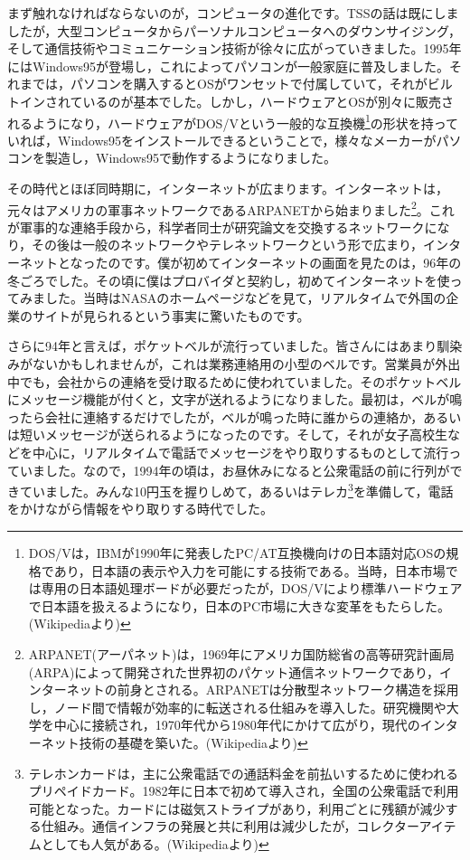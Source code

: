 \documentclass{ltjsbook}
\begin{document}
まず触れなければならないのが，コンピュータの進化です。TSSの話は既にしましたが，大型コンピュータからパーソナルコンピュータへのダウンサイジング，そして通信技術やコミュニケーション技術が徐々に広がっていきました。1995年にはWindows95が登場し，これによってパソコンが一般家庭に普及しました。それまでは，パソコンを購入するとOSがワンセットで付属していて，それがビルトインされているのが基本でした。しかし，ハードウェアとOSが別々に販売されるようになり，ハードウェアがDOS/Vという一般的な互換機\footnote{DOS/Vは，IBMが1990年に発表したPC/AT互換機向けの日本語対応OSの規格であり，日本語の表示や入力を可能にする技術である。当時，日本市場では専用の日本語処理ボードが必要だったが，DOS/Vにより標準ハードウェアで日本語を扱えるようになり，日本のPC市場に大きな変革をもたらした。(Wikipediaより)}の形状を持っていれば，Windows95をインストールできるということで，様々なメーカーがパソコンを製造し，Windows95で動作するようになりました。

その時代とほぼ同時期に，インターネットが広まります。インターネットは，元々はアメリカの軍事ネットワークであるARPANETから始まりました\footnote{ARPANET(アーパネット)は，1969年にアメリカ国防総省の高等研究計画局(ARPA)によって開発された世界初のパケット通信ネットワークであり，インターネットの前身とされる。ARPANETは分散型ネットワーク構造を採用し，ノード間で情報が効率的に転送される仕組みを導入した。研究機関や大学を中心に接続され，1970年代から1980年代にかけて広がり，現代のインターネット技術の基礎を築いた。(Wikipediaより)}。これが軍事的な連絡手段から，科学者同士が研究論文を交換するネットワークになり，その後は一般のネットワークやテレネットワークという形で広まり，インターネットとなったのです。僕が初めてインターネットの画面を見たのは，96年の冬ごろでした。その頃に僕はプロバイダと契約し，初めてインターネットを使ってみました。当時はNASAのホームページなどを見て，リアルタイムで外国の企業のサイトが見られるという事実に驚いたものです。

さらに94年と言えば，ポケットベルが流行っていました。皆さんにはあまり馴染みがないかもしれませんが，これは業務連絡用の小型のベルです。営業員が外出中でも，会社からの連絡を受け取るために使われていました。そのポケットベルにメッセージ機能が付くと，文字が送れるようになりました。最初は，ベルが鳴ったら会社に連絡するだけでしたが，ベルが鳴った時に誰からの連絡か，あるいは短いメッセージが送られるようになったのです。そして，それが女子高校生などを中心に，リアルタイムで電話でメッセージをやり取りするものとして流行っていました。なので，1994年の頃は，お昼休みになると公衆電話の前に行列ができていました。みんな10円玉を握りしめて，あるいはテレカ\footnote{テレホンカードは，主に公衆電話での通話料金を前払いするために使われるプリペイドカード。1982年に日本で初めて導入され，全国の公衆電話で利用可能となった。カードには磁気ストライプがあり，利用ごとに残額が減少する仕組み。通信インフラの発展と共に利用は減少したが，コレクターアイテムとしても人気がある。(Wikipediaより)}を準備して，電話をかけながら情報をやり取りする時代でした。
\end{document}
